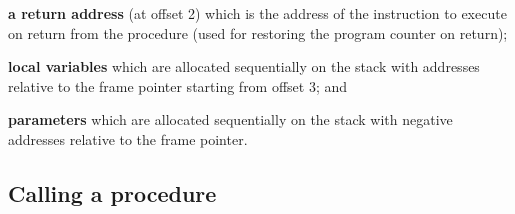 \documentclass[fontsize=10pt,a4paper]{article}
\begin{document}
\begin{multicols}{3}
    \textbf{a return address} (at offset 2) which is the address of the instruction to execute on return from the procedure (used for restoring the program counter on return);

    \textbf{local variables} which are allocated sequentially on the stack with addresses relative to the frame pointer starting from offset 3; and

    \textbf{parameters} which are allocated sequentially on the stack with negative addresses relative to the frame pointer.

    \subsection{Calling a procedure}

    \begin{enumerate}
    \end{enumerate}


\end{multicols}
\end{document}

